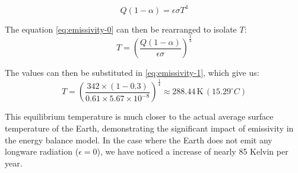 \documentclass[12pt]{article}
\begin{document}
\begin{equation} \label{eq:emissivity-0}
    Q(1 - \alpha) = \epsilon\sigma T^4
\end{equation}

\noindent The equation \ref{eq:emissivity-0} can then be rearranged to isolate $T$:
\begin{equation} \label{eq:emissivity-1}
    T = \left( \frac{Q(1 - \alpha)}{\epsilon\sigma} \right)^{\frac{1}{4}}
\end{equation}

\noindent The values can then be substituted in \ref{eq:emissivity-1}, which give us:
\begin{equation}
    T = \left( \frac{342 \times (1 - 0.3)}{0.61 \times 5.67 \times 10^{-8}} \right)^{\frac{1}{4}} \approx 288.44 \, \text{K} \, ({15.29}^\circ C)
\end{equation}


This equilibrium temperature is much closer to the actual average surface temperature of the Earth, demonstrating the significant impact of emissivity
in the energy balance model. In the case where the Earth does not emit any longware radiation ($\epsilon=0$), we have noticed a increase of nearly 85 Kelvin per year.
\end{document}
